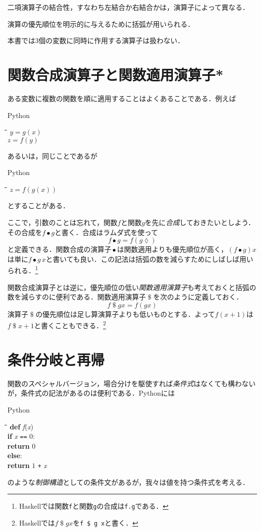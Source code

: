 \documentclass[twocolumn]{jsbook}
\newcommand{\keyword}[1]{{\emph{#1}}}
\newcommand{\code}[1]{\texttt{#1}}
\newenvironment{pythoncode}{\begin{itembox}[r]{Python}}{\end{itembox}}
\newenvironment{python}{\begin{tabbing}\hspace*{1em}\=\hspace*{1em}\=\hspace*{1em}\=\hspace*{1em}\=\kill}{\end{tabbing}}
\newcommand{\pthnId}[1]{\textit{#1}}
\newcommand{\pthnKeyword}[1]{\textbf{#1}}
\newcommand{\pthnOp}[1]{\texttt{#1}}
\DeclareMathOperator{\mathApply}{\$}
\DeclareMathOperator{\mathCompose}{\bullet}
\newcommand{\mathLambdaAnonymousParameter}{\lozenge}
\begin{document}
二項演算子の結合性，すなわち左結合か右結合かは，演算子によって異なる．

演算の優先順位を明示的に与えるために括弧が用いられる．

本書では3個の変数に同時に作用する演算子は扱わない．

\section{関数合成演算子と関数適用演算子*}

ある変数に複数の関数を順に適用することはよくあることである．例えば
\begin{pythoncode}
\begin{python}
$y=g(x)$\\
$z=f(y)$
\end{python}
\end{pythoncode}
あるいは，同じことであるが
\begin{pythoncode}
\begin{python}
$z=f(g(x))$
\end{python}
\end{pythoncode}
とすることがある．

ここで，引数のことは忘れて，関数$f$と関数$g$を先に\keyword{合成}しておきたいとしよう．その合成を$f\mathCompose g$と書く．合成はラムダ式を使って$$f\mathCompose g=f(g\mathLambdaAnonymousParameter)$$と定義できる．関数合成の演算子$\mathCompose$は関数適用よりも優先順位が高く，$(f\mathCompose g)x$は単に$f\mathCompose g\,x$と書いても良い．この記法は括弧の数を減らすためにしばしば用いられる．\footnote{Haskellでは関数\code{f}と関数\code{g}の合成は\code{f.g}である．}

関数合成演算子とは逆に，優先順位の低い\keyword{関数適用演算子}も考えておくと括弧の数を減らすのに便利である．関数適用演算子$\mathApply$を次のように定義しておく．$$f\mathApply gx=f(gx)$$演算子$\mathApply$の優先順位は足し算演算子よりも低いものとする．よって$f(x+1)$は$f\mathApply x+1$と書くこともできる．\footnote{Haskellでは$f\mathApply gx$を\code{f \$ g x}と書く．}

\section{条件分岐と再帰}

関数のスペシャルバージョン，場合分けを駆使すれば\keyword{条件式}はなくても構わないが，条件式の記法があるのは便利である．Pythonには
\begin{pythoncode}
\begin{python}
\pthnKeyword{def} \pthnId{f}(\pthnId{x})\\
\>\pthnKeyword{if} \pthnId{x} \pthnOp{==} $0$:\\
\>\>\pthnKeyword{return} $0$\\
\>\pthnKeyword{else}:\\
\>\>\pthnKeyword{return} $1$ \pthnOp{+} \pthnId{x}
\end{python}
\end{pythoncode}
のような\keyword{制御構造}としての条件文があるが，我々は値を持つ条件式を考える．
\end{document}
